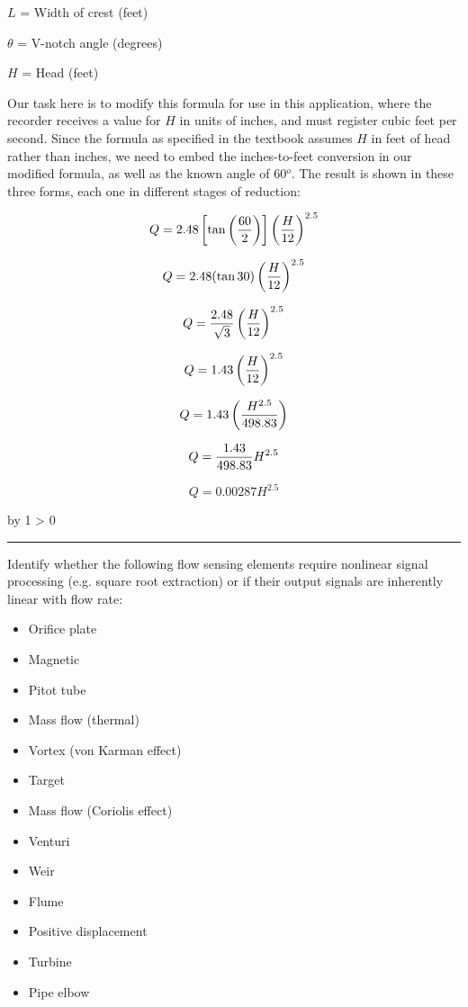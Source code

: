 \documentclass[12pt,a4paper]{article}
\def\oppgave{
            \advance\questnum by 1
            \ifnum \questnum > 0
                 \hrule
                 \vskip 3pt
                 \leftline{Oppgave \the\questnum}
                 \vskip 3pt \fi}
\begin{document}
$L$ = Width of crest (feet)

$\theta$ = V-notch angle (degrees)

$H$ = Head (feet)

\vskip 10pt

Our task here is to modify this formula for use in this application, where the recorder receives a value for $H$ in units of inches, and must register cubic feet per second.  Since the formula as specified in the textbook assumes $H$ in feet of head rather than inches, we need to embed the inches-to-feet conversion in our modified formula, as well as the known angle of 60$^{o}$.  The result is shown in these three forms, each one in different stages of reduction:

$$Q = 2.48 \left[\tan \left(60 \over 2\right)\right] \left({H \over 12} \right)^{2.5}$$

$$Q = 2.48 (\tan 30) \left({H \over 12} \right)^{2.5}$$

$$Q = {2.48 \over \sqrt{3}} \left({H \over 12} \right)^{2.5}$$

$$Q = 1.43 \left({H \over 12} \right)^{2.5}$$

$$Q = 1.43 \left({H^{2.5} \over 498.83} \right)$$

$$Q = {1.43 \over 498.83} H^{2.5}$$

$$Q = 0.00287 H^{2.5}$$


\vfil \eject 


\oppgave{} 

Identify whether the following flow sensing elements require nonlinear signal processing (e.g. square root extraction) or if their output signals are inherently linear with flow rate:

\begin{itemize}
\item{} Orifice plate
\vskip 5pt
\item{} Magnetic
\vskip 5pt
\item{} Pitot tube
\vskip 5pt
\item{} Mass flow (thermal)
\vskip 5pt
\item{} Vortex (von Karman effect)
\vskip 5pt
\item{} Target
\vskip 5pt
\item{} Mass flow (Coriolis effect)
\vskip 5pt
\item{} Venturi
\vskip 5pt
\item{} Weir
\vskip 5pt
\item{} Flume
\vskip 5pt
\item{} Positive displacement
\vskip 5pt
\item{} Turbine
\vskip 5pt
\item{} Pipe elbow
\end{itemize}
\end{document}
